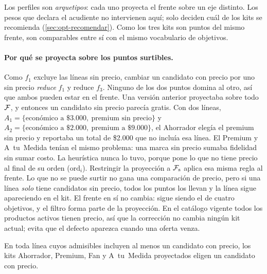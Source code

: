 Los perfiles son \emph{arquetipos}: cada uno proyecta el frente sobre un eje
distinto. Los pesos que declara el acudiente no intervienen aquí; solo deciden
cuál de los kits se recomienda (\cref{sec:opt-recomendar}). Como los tres kits
son puntos del mismo frente, son comparables entre sí con el mismo vocabulario
de objetivos.

\paragraph{Por qué se proyecta sobre los puntos surtibles.}
\label{obs:sin-precio}
Como $f_1$ excluye las líneas sin precio, cambiar un candidato con precio por
uno sin precio \emph{reduce} $f_1$ y reduce $f_3$. Ninguno de los dos puntos
domina al otro, así que ambos pueden estar en el frente. Una versión anterior
proyectaba sobre todo $\mathcal{F}$, y entonces un candidato sin precio parecía
gratis. Con dos líneas, $A_1=\{\text{económico a }\$3.000,\ \text{premium sin
precio}\}$ y $A_2=\{\text{económico a }\$2.000,\ \text{premium a }\$9.000\}$,
el Ahorrador elegía el premium sin precio y reportaba un total de \$2.000 que
no incluía esa línea. El Premium y A~tu~Medida tenían el mismo problema: una
marca sin precio sumaba fidelidad sin sumar costo. La heurística nunca lo tuvo,
porque pone lo que no tiene precio al final de su orden ($\mathrm{ord}_i$).
Restringir la proyección a $\mathcal{F}_{\mathrm{s}}$ aplica esa misma regla al
frente. Lo que no se puede surtir no gana una comparación de precio, pero si
una línea \emph{solo} tiene candidatos sin precio, todos los puntos los llevan
y la línea sigue apareciendo en el kit. El frente en sí no cambia: sigue
siendo el de cuatro objetivos, y el filtro forma parte de la proyección. En el
catálogo vigente todos los productos activos tienen precio, así que la
corrección no cambia ningún kit actual; evita que el defecto aparezca cuando
una oferta venza.

\begin{proposicion}
\label{prop:surtibles}
En toda línea cuyos admisibles incluyen al menos un candidato con precio, los
kits Ahorrador, Premium, Fan y A~tu~Medida proyectados eligen un candidato
con precio.
\end{proposicion}

